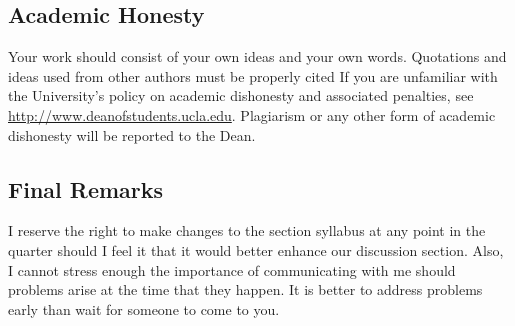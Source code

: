 \documentclass[11pt,]{article}
\begin{document}
\subsection{Academic Honesty}\label{academic-honesty}

Your work should consist of your own ideas and your own words.
Quotations and ideas used from other authors must be properly cited If
you are unfamiliar with the University's policy on academic dishonesty
and associated penalties, see \url{http://www.deanofstudents.ucla.edu}.
Plagiarism or any other form of academic dishonesty will be reported to
the Dean.

\subsection{Final Remarks}\label{final-remarks}

I reserve the right to make changes to the section syllabus at any point
in the quarter should I feel it that it would better enhance our
discussion section. Also, I cannot stress enough the importance of
communicating with me should problems arise at the time that they
happen. It is better to address problems early than wait for someone to
come to you.
\end{document}

